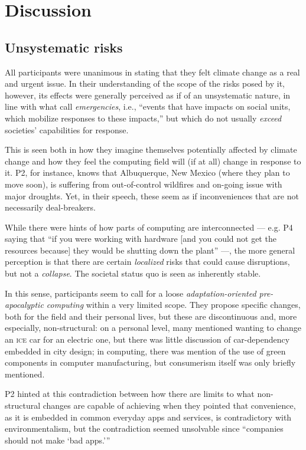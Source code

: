 \section{Discussion}

\subsection{Unsystematic risks}

All participants were unanimous in stating that they felt climate change as a real and urgent issue. In their understanding of the scope of the risks posed by it, however, its effects were generally perceived as if of an unsystematic nature, in line with what \citeauthor{silberman2010precarious} call \emph{emergencies}, i.e., ``events that have impacts on social units, which mobilize responses to these impacts,'' but which do not usually \emph{exceed} societies' capabilities for response.

This is seen both in how they imagine themselves potentially affected by climate change and how they feel the computing field will (if at all) change in response to it. P2, for instance, knows that Albuquerque, New Mexico (where they plan to move soon), is suffering from out-of-control wildfires and on-going issue with major droughts. Yet, in their speech, these seem as if inconveniences that are not necessarily deal-breakers.

While there were hints of how parts of computing are interconnected --- e.g. P4 saying that ``if you were working with hardware [and you could not get the resources because] they would be shutting down the plant'' ---, the more general perception is that there are certain \emph{localized} risks that could cause disruptions, but not a \emph{collapse}. The societal status quo is seen as inherently stable.

In this sense, participants seem to call for a loose \emph{adaptation-oriented pre-apocalyptic computing} within a very limited scope. They propose specific changes, both for the field and their personal lives, but these are discontinuous and, more especially, non-structural: on a personal level, many mentioned wanting to change an \textsc{ice} car for an electric one, but there was little discussion of car-dependency embedded in city design; in computing, there was mention of the use of green components in computer manufacturing, but consumerism itself was only briefly mentioned.

P2 hinted at this contradiction between how there are limits to what non-structural changes are capable of achieving when they pointed that convenience, as it is embedded in common everyday apps and services, is contradictory with environmentalism, but the contradiction seemed unsolvable since ``companies should not make `bad apps.'\thinspace''

